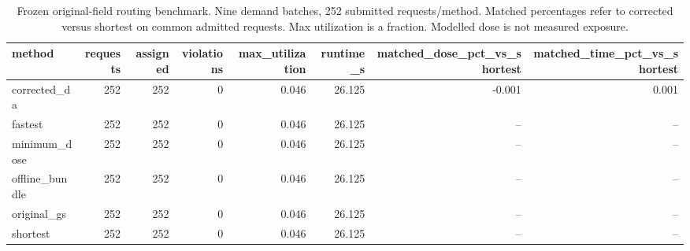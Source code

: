 \begin{table}[t]
\centering
\footnotesize
\caption{Frozen original-field routing benchmark. Nine demand batches, 252 submitted requests/method. Matched percentages refer to corrected versus shortest on common admitted requests. Max utilization is a fraction. Modelled dose is not measured exposure.}
\label{tab:t07}
\begin{tabular}{lrrrrrrr}
\hline
method & requests & assigned & violations & max\_utilization & runtime\_s & matched\_dose\_pct\_vs\_shortest & matched\_time\_pct\_vs\_shortest \\
\hline
corrected\_da & 252 & 252 & 0 & 0.046 & 26.125 & -0.001 & 0.001 \\
fastest & 252 & 252 & 0 & 0.046 & 26.125 & -- & -- \\
minimum\_dose & 252 & 252 & 0 & 0.046 & 26.125 & -- & -- \\
offline\_bundle & 252 & 252 & 0 & 0.046 & 26.125 & -- & -- \\
original\_gs & 252 & 252 & 0 & 0.046 & 26.125 & -- & -- \\
shortest & 252 & 252 & 0 & 0.046 & 26.125 & -- & -- \\
\hline
\end{tabular}
\end{table}
